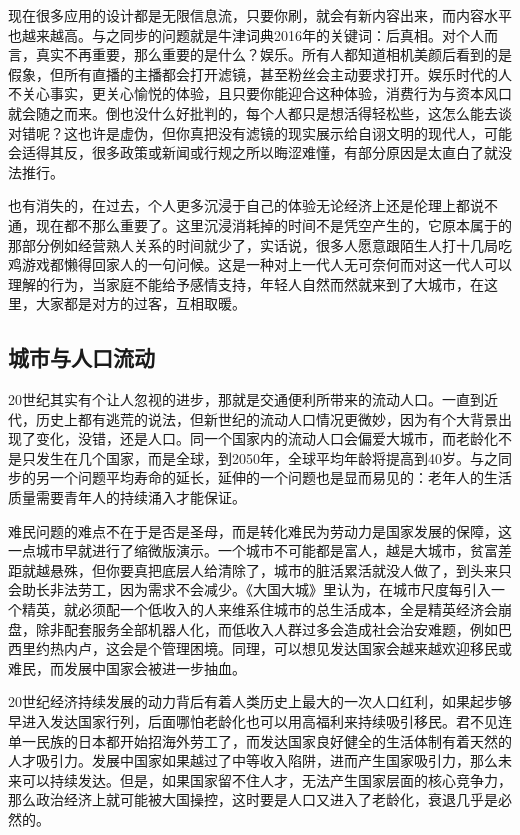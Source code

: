 \documentclass[]{book}
\begin{document}
现在很多应用的设计都是无限信息流，只要你刷，就会有新内容出来，而内容水平也越来越高。与之同步的问题就是牛津词典2016年的关键词：后真相。对个人而言，真实不再重要，那么重要的是什么？娱乐。所有人都知道相机美颜后看到的是假象，但所有直播的主播都会打开滤镜，甚至粉丝会主动要求打开。娱乐时代的人不关心事实，更关心愉悦的体验，且只要你能迎合这种体验，消费行为与资本风口就会随之而来。倒也没什么好批判的，每个人都只是想活得轻松些，这怎么能去谈对错呢？这也许是虚伪，但你真把没有滤镜的现实展示给自诩文明的现代人，可能会适得其反，很多政策或新闻或行规之所以晦涩难懂，有部分原因是太直白了就没法推行。

也有消失的，在过去，个人更多沉浸于自己的体验无论经济上还是伦理上都说不通，现在都不那么重要了。这里沉浸消耗掉的时间不是凭空产生的，它原本属于的那部分例如经营熟人关系的时间就少了，实话说，很多人愿意跟陌生人打十几局吃鸡游戏都懒得回家人的一句问候。这是一种对上一代人无可奈何而对这一代人可以理解的行为，当家庭不能给予感情支持，年轻人自然而然就来到了大城市，在这里，大家都是对方的过客，互相取暖。

\hypertarget{ux57ceux5e02ux4e0eux4ebaux53e3ux6d41ux52a8}{%
\subsection{城市与人口流动}\label{ux57ceux5e02ux4e0eux4ebaux53e3ux6d41ux52a8}}

20世纪其实有个让人忽视的进步，那就是交通便利所带来的流动人口。一直到近代，历史上都有逃荒的说法，但新世纪的流动人口情况更微妙，因为有个大背景出现了变化，没错，还是人口。同一个国家内的流动人口会偏爱大城市，而老龄化不是只发生在几个国家，而是全球，到2050年，全球平均年龄将提高到40岁。与之同步的另一个问题平均寿命的延长，延伸的一个问题也是显而易见的：老年人的生活质量需要青年人的持续涌入才能保证。

难民问题的难点不在于是否是圣母，而是转化难民为劳动力是国家发展的保障，这一点城市早就进行了缩微版演示。一个城市不可能都是富人，越是大城市，贫富差距就越悬殊，但你要真把底层人给清除了，城市的脏活累活就没人做了，到头来只会助长非法劳工，因为需求不会减少。《大国大城》里认为，在城市尺度每引入一个精英，就必须配一个低收入的人来维系住城市的总生活成本，全是精英经济会崩盘，除非配套服务全部机器人化，而低收入人群过多会造成社会治安难题，例如巴西里约热内卢，这会是个管理困境。同理，可以想见发达国家会越来越欢迎移民或难民，而发展中国家会被进一步抽血。

20世纪经济持续发展的动力背后有着人类历史上最大的一次人口红利，如果起步够早进入发达国家行列，后面哪怕老龄化也可以用高福利来持续吸引移民。君不见连单一民族的日本都开始招海外劳工了，而发达国家良好健全的生活体制有着天然的人才吸引力。发展中国家如果越过了中等收入陷阱，进而产生国家吸引力，那么未来可以持续发达。但是，如果国家留不住人才，无法产生国家层面的核心竞争力，那么政治经济上就可能被大国操控，这时要是人口又进入了老龄化，衰退几乎是必然的。
\end{document}
